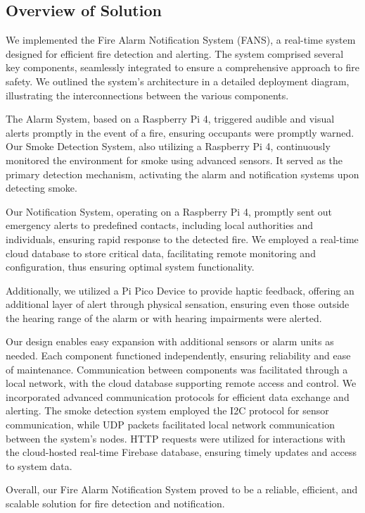 \subsection{Overview of Solution}

We implemented the Fire Alarm Notification System (FANS), a real-time system designed for efficient
fire detection and alerting. The system comprised several key components, seamlessly integrated to ensure a
comprehensive approach to fire safety. We outlined the system's architecture in a detailed deployment diagram,
illustrating the interconnections between the various components.

The Alarm System, based on a Raspberry Pi 4, triggered audible and visual alerts promptly in the event of a fire,
ensuring occupants were promptly warned. Our Smoke Detection System, also utilizing a Raspberry Pi 4, continuously
monitored the environment for smoke using advanced sensors. It served as the primary detection mechanism, activating
the alarm and notification systems upon detecting smoke.

Our Notification System, operating on a Raspberry Pi 4, promptly sent out emergency alerts to predefined contacts,
including local authorities and individuals, ensuring rapid response to the detected fire. We employed a real-time
cloud database to store critical data, facilitating remote monitoring and configuration, thus ensuring optimal system
functionality.

Additionally, we utilized a Pi Pico Device to provide haptic feedback, offering an additional layer of alert through
physical sensation, ensuring even those outside the hearing range of the alarm or with hearing impairments were
alerted.

Our design enables easy expansion with additional sensors or alarm units as needed. Each
component functioned independently, ensuring reliability and ease of maintenance. Communication between components was
facilitated through a local network, with the cloud database supporting remote access and control. We incorporated
advanced communication protocols for efficient data exchange and alerting. The smoke detection system employed the I2C
protocol for sensor communication, while UDP packets facilitated local network communication between the system's
nodes. HTTP requests were utilized for interactions with the cloud-hosted real-time Firebase database, ensuring timely
updates and access to system data.

Overall, our Fire Alarm Notification System proved to be a reliable, efficient, and scalable solution for fire detection 
and notification.


